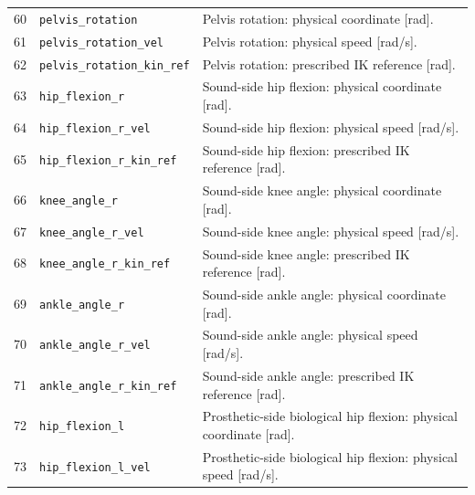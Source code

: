 {\begin{longtable}{@{}r p{7.2cm} p{7.5cm}@{}}
60 & {\fontsize{7.6}{9.2}\selectfont\texttt{pelvis\_\allowbreak{}rotation}} & Pelvis rotation: physical coordinate [rad].\\
61 & {\fontsize{7.6}{9.2}\selectfont\texttt{pelvis\_\allowbreak{}rotation\_\allowbreak{}vel}} & Pelvis rotation: physical speed [rad/s].\\
62 & {\fontsize{7.6}{9.2}\selectfont\texttt{pelvis\_\allowbreak{}rotation\_\allowbreak{}kin\_\allowbreak{}ref}} & Pelvis rotation: prescribed IK reference [rad].\\
63 & {\fontsize{7.6}{9.2}\selectfont\texttt{hip\_\allowbreak{}flexion\_\allowbreak{}r}} & Sound-side hip flexion: physical coordinate [rad].\\
64 & {\fontsize{7.6}{9.2}\selectfont\texttt{hip\_\allowbreak{}flexion\_\allowbreak{}r\_\allowbreak{}vel}} & Sound-side hip flexion: physical speed [rad/s].\\
65 & {\fontsize{7.6}{9.2}\selectfont\texttt{hip\_\allowbreak{}flexion\_\allowbreak{}r\_\allowbreak{}kin\_\allowbreak{}ref}} & Sound-side hip flexion: prescribed IK reference [rad].\\
66 & {\fontsize{7.6}{9.2}\selectfont\texttt{knee\_\allowbreak{}angle\_\allowbreak{}r}} & Sound-side knee angle: physical coordinate [rad].\\
67 & {\fontsize{7.6}{9.2}\selectfont\texttt{knee\_\allowbreak{}angle\_\allowbreak{}r\_\allowbreak{}vel}} & Sound-side knee angle: physical speed [rad/s].\\
68 & {\fontsize{7.6}{9.2}\selectfont\texttt{knee\_\allowbreak{}angle\_\allowbreak{}r\_\allowbreak{}kin\_\allowbreak{}ref}} & Sound-side knee angle: prescribed IK reference [rad].\\
69 & {\fontsize{7.6}{9.2}\selectfont\texttt{ankle\_\allowbreak{}angle\_\allowbreak{}r}} & Sound-side ankle angle: physical coordinate [rad].\\
70 & {\fontsize{7.6}{9.2}\selectfont\texttt{ankle\_\allowbreak{}angle\_\allowbreak{}r\_\allowbreak{}vel}} & Sound-side ankle angle: physical speed [rad/s].\\
71 & {\fontsize{7.6}{9.2}\selectfont\texttt{ankle\_\allowbreak{}angle\_\allowbreak{}r\_\allowbreak{}kin\_\allowbreak{}ref}} & Sound-side ankle angle: prescribed IK reference [rad].\\
72 & {\fontsize{7.6}{9.2}\selectfont\texttt{hip\_\allowbreak{}flexion\_\allowbreak{}l}} & Prosthetic-side biological hip flexion: physical coordinate [rad].\\
73 & {\fontsize{7.6}{9.2}\selectfont\texttt{hip\_\allowbreak{}flexion\_\allowbreak{}l\_\allowbreak{}vel}} & Prosthetic-side biological hip flexion: physical speed [rad/s].\\

\end{longtable}}
